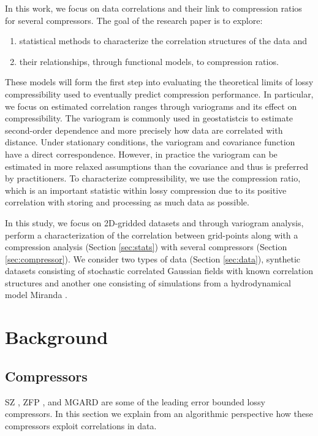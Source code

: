 \documentclass[conference]{IEEEtran}
\begin{document}
In this work, we focus on data correlations and their link to compression ratios for several compressors.  
The goal of the research paper is to explore:
%
\begin{enumerate}
    \item statistical methods to characterize the correlation structures of the data and
    \item their relationships, through functional models, to compression ratios.  
\end{enumerate} 
%
These models will form the first step into evaluating the theoretical limits of lossy compressibility used to eventually predict compression performance. 
In particular, we focus on estimated correlation ranges through variograms and its effect on compressibility. The variogram is commonly used in geostatistcis to estimate second-order dependence and more precisely how data are correlated with distance. 
Under stationary conditions, the variogram and covariance function have a direct correspondence. However, in practice the variogram can be estimated in more relaxed assumptions than the  covariance and thus is preferred by practitioners. 
To characterize compressibility, we use the compression ratio,  which is an important statistic within lossy compression due to its positive correlation with storing and processing as much data as possible. 


 In this study, we focus on 2D-gridded datasets and through variogram analysis, perform a characterization of the  correlation between  grid-points along with a compression analysis (Section \ref{sec:stats}) with several compressors (Section \ref{sec:compressor}). 
 We consider two types  of data (Section \ref{sec:data}), synthetic datasets consisting of stochastic correlated Gaussian fields with  known correlation structures and another one consisting of simulations from a hydrodynamical model Miranda \cite{capello_zhao_di_tao_bessac_chen}. 
 
\section{Background}

\subsection{Compressors}\label{sec:compressablity:compressors}
SZ \cite{Liang2018}, ZFP \cite{Lindstrom2006}, and MGARD \cite{Ainsworth2019} are some of the leading error bounded lossy compressors.
In this section we explain from an algorithmic perspective how these compressors exploit correlations in data.
\end{document}
